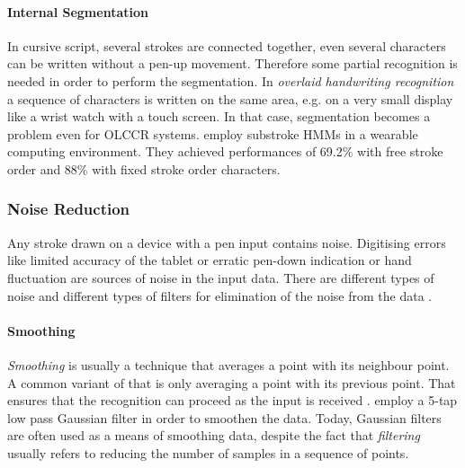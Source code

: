 \paragraph{Internal Segmentation}
\label{sec:internalsegmentation}
In cursive script, several strokes are connected together, even several 
characters can be written without a pen-up movement. Therefore some partial 
recognition is needed in order to perform the segmentation.
In \emph{overlaid handwriting recognition} a sequence of characters is written 
on the same area, e.g. on a very small display like a wrist watch with a touch 
screen. In that case, segmentation becomes a problem even for OLCCR systems.
 employ substroke HMMs in a wearable computing 
environment. They achieved performances of 69.2\% with free stroke order
and 88\% with fixed stroke order characters.

\subsubsection{Noise Reduction} 
\label{sec:noisereduction}
Any stroke drawn on a device with a pen input contains noise. Digitising errors
like limited accuracy of the tablet or erratic pen-down indication or hand 
fluctuation are sources of noise in the input data.  There are different types 
of noise and different types of filters for elimination of the noise from the 
data .

\paragraph{Smoothing}
\label{sec:smoothing}
\emph{Smoothing} is usually a technique that averages a point with its 
neighbour point. A common variant of that is only averaging a point with its
previous point. That ensures that the recognition can proceed as the input
is received .  employ a 5-tap low 
pass Gaussian filter in order to smoothen the data. Today, Gaussian filters are 
often used as a means of smoothing data, despite the fact that \emph{filtering}
usually refers to reducing the number of samples in a sequence of points.

